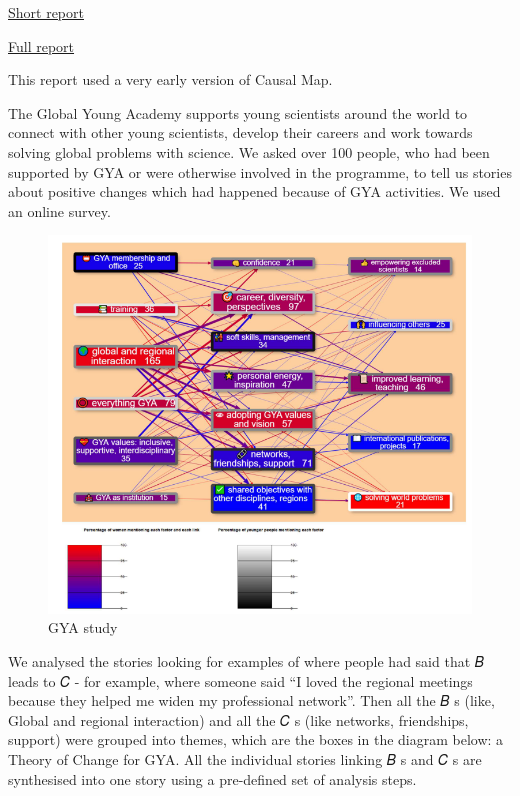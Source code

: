 \documentclass[
]{book}
\begin{document}
\href{https://globalyoungacademy.net/wp-content/uploads/2019/04/GYA-Impact-Analysis-2018_Final.pdf}{Short report}

\href{https://globalyoungacademy.net/wp-content/uploads/2019/04/GYA-Impact-Analyisis-2018-Technical-Appendix.pdf}{Full report}

This report used a very early version of Causal Map.

The Global Young Academy supports young scientists around the world to connect with
other young scientists, develop their careers and work towards solving global problems
with science. We asked over 100 people, who had been supported by GYA or were
otherwise involved in the programme, to tell us stories about positive changes which had
happened because of GYA activities. We used an online survey.

\begin{figure}
\centering
\includegraphics{_assets/a5fe43e040d834d29f87af7e2dc8daa9.png}
\caption{GYA study}
\end{figure}

We analysed the stories looking for examples of where people had said that 𝐵 leads to 𝐶 -
for example, where someone said ``I loved the regional meetings because they helped me
widen my professional network''. Then all the 𝐵 s (like, Global and regional interaction) and
all the 𝐶 s (like networks, friendships, support) were grouped into themes, which are the
boxes in the diagram below: a Theory of Change for GYA. All the individual stories linking 𝐵 s and 𝐶 s are synthesised into one story using a pre-defined set of analysis steps.
\end{document}

